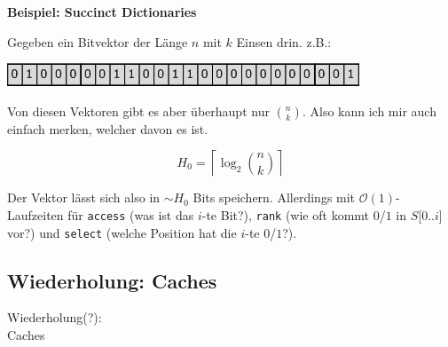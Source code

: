 \documentclass{beamer}
\begin{document}

\begin{frame}

\textbf{Beispiel: Succinct Dictionaries}
\bigskip

Gegeben ein Bitvektor der Länge $n$ mit $k$ Einsen drin. z.B.:

\begin{center}
\includegraphics[scale=0.751]{bitvector.png} 
\end{center}
\pause

Von diesen Vektoren gibt es aber überhaupt nur $\binom{n}{k}$. Also kann ich mir auch einfach merken, welcher davon es ist.\pause

$$H_0 = \left\lceil \log_2{\binom{n}{k}} \right\rceil$$

Der Vektor lässt sich also in $\sim H_0$ Bits speichern.\pause
Allerdings mit $\mathcal{O}(1)$-Laufzeiten für \texttt{access} (was ist das $i$-te Bit?), \texttt{rank} (wie oft kommt $0$/$1$ in $S$[0..$i$] vor?) und \texttt{select} (welche Position hat die $i$-te $0$/$1$?).
\end{frame}


\subsection{Wiederholung: Caches}

\begin{frame}
\Large
\begin{center}
Wiederholung(?):\\
Caches
\end{center}
\normalsize
\end{frame}

\end{document}
